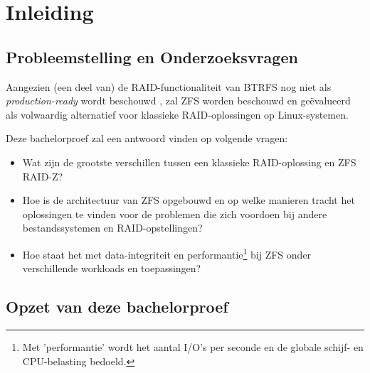 
\chapter{Inleiding}
\label{ch:inleiding}

\section{Probleemstelling en Onderzoeksvragen}
\label{sec:onderzoeksvragen}


Aangezien (een deel van) de RAID-functionaliteit van BTRFS nog niet als \textit{production-ready} wordt beschouwd \autocite{Project2017}, zal ZFS worden beschouwd en geëvalueerd als volwaardig alternatief voor klassieke RAID-oplossingen op Linux-systemen. 

Deze bachelorproef zal een antwoord vinden op volgende vragen:

\begin{itemize}
	\item{Wat zijn de grootste verschillen tussen een klassieke RAID-oplossing en ZFS RAID-Z?}
	\item{Hoe is de architectuur van ZFS opgebouwd en op welke manieren tracht het oplossingen te vinden voor de problemen die zich voordoen bij andere bestandssystemen en RAID-opstellingen?}
  \item{Hoe staat het met data-integriteit en \gls{performantie}\footnote{Met 'performantie' wordt het aantal I/O's per seconde en de globale schijf- en CPU-belasting bedoeld.} bij ZFS onder verschillende workloads en toepassingen?}
\end{itemize}

\section{Opzet van deze bachelorproef}
\label{sec:opzet-bachelorproef}


